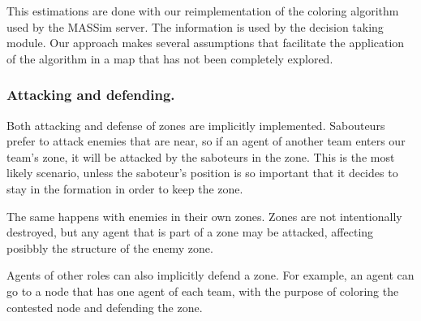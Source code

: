 \documentclass{llncs2e/llncs}
\begin{document}
    This estimations are done with our reimplementation of the coloring
    algorithm used by the MASSim server. The information is used by the decision
    taking module.  Our approach makes several assumptions that facilitate the
    application of the algorithm in a map that has not been completely explored.
    
    
    
    
    


\subsubsection{Attacking and defending.}
    
    Both attacking and defense of zones are implicitly implemented. 
    Sabouteurs prefer to attack enemies that are near, so if an agent of another 
    team enters our team's zone, it will be attacked by the saboteurs in the zone.
    This is the most likely scenario, unless the saboteur's position is so 
    important that it decides to stay in the formation in order to keep the zone.

    The same happens with enemies in their own zones. Zones are not intentionally 
    destroyed, but any agent that is part of a zone may be attacked, affecting 
    posibbly the structure of the enemy zone.
    
    Agents of other roles can also implicitly defend a zone. For example, an agent 
    can go to a node that has one agent of each team, with the purpose of coloring the 
    contested node and defending the zone.
\end{document}
